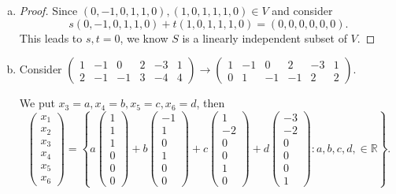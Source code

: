 \begin{Exercise}
\begin{enumerate}[(a)]
\item
\begin{proof}
Since $(0,-1,0,1,1,0),(1,0,1,1,1,0)\in V$ and consider $$
s(0,-1,0,1,1,0)+t(1,0,1,1,1,0) = (0,0,0,0,0,0).
$$
This leads to $s,t = 0$, we know $S$ is a linearly independent subset of $V$.
\end{proof}

\item
\begin{solution}
Consider
$\begin{pmatrix}
1 & -1 & 0 & 2 & -3 & 1 \\
2 & -1 & -1 & 3 & -4 & 4
\end{pmatrix} \longrightarrow \begin{pmatrix}
1 & -1 & 0 & 2 & -3 & 1 \\
0 & 1 & -1 & -1 & 2 & 2
\end{pmatrix}$.

We put $x_3 = a, x_4 = b,x_5 = c,x_6=d$, then
$$
\begin{pmatrix}
x_1 \\
x_2 \\
x_3 \\
x_4 \\
x_5 \\
x_6
\end{pmatrix} = \left\{ a\begin{pmatrix}
1 \\
1 \\
1 \\
0 \\
0 \\
0
\end{pmatrix} + b\begin{pmatrix}
-1 \\
1 \\
0 \\
1 \\
0 \\
0
\end{pmatrix} + c\begin{pmatrix}
1 \\
-2 \\
0 \\
0 \\
1 \\
0
\end{pmatrix} + d\begin{pmatrix}
-3 \\
-2 \\
0 \\
0 \\
0 \\
1
\end{pmatrix} :a,b,c,d,\in\mathbb{R} \right\}.
$$


\end{solution}
\end{enumerate}
\end{Exercise}
